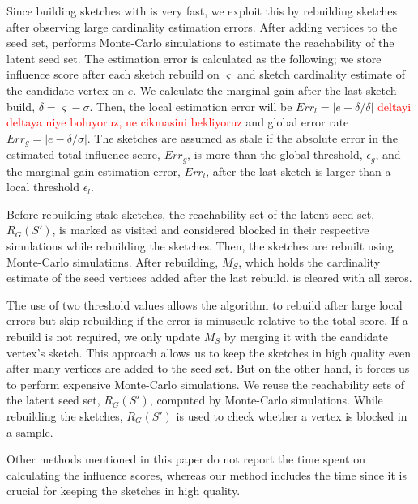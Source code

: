 \documentclass[10pt,journal,compsoc]{IEEEtran}
\newcommand\acro{{\sc{HyperFuseR\xspace}\xspace}\xspace}
\newcommand\kktodo[1]{\textcolor{red}{#1}}
\begin{document}
Since building sketches with \acro is very fast, we exploit this by rebuilding sketches after observing large cardinality estimation errors.
After adding vertices to the seed set, \acro performs Monte-Carlo simulations to estimate the reachability of the latent seed set.
The estimation error is calculated as the following; we store influence score after each sketch rebuild on $\varsigma$ and sketch cardinality estimate of the candidate vertex on $e$. We calculate the marginal gain after the last sketch build, $\delta=\varsigma - \sigma$. Then, the local estimation error will be $Err_l=|e-\delta / \delta|$ \kktodo{deltayi deltaya niye boluyoruz, ne cikmasini bekliyoruz} and global error rate $Err_g=|e-\delta / \sigma|$. 
The sketches are assumed as stale if the absolute error in the estimated total influence score, $Err_g$, is more than the global threshold, $\epsilon_{g}$, 
and the marginal gain estimation error, $Err_l$, after the last sketch is larger than a local threshold $\epsilon_{l}$.

Before rebuilding stale sketches, the reachability set of the latent seed set, $R_G(S')$, is marked as visited and considered blocked in their respective simulations while rebuilding the sketches. Then, the sketches are rebuilt using Monte-Carlo simulations. After rebuilding, $M_S$, which holds the cardinality estimate of the seed vertices added after the last rebuild, is cleared with all zeros.

The use of two threshold values allows the algorithm to rebuild after large local errors but skip rebuilding if the error is minuscule relative to the total score. 
If a rebuild is not required, we only update $M_S$ by merging it with the candidate vertex's sketch. 
This approach allows us to keep the sketches in high quality even after many vertices are added to the seed set. But on the other hand, it forces us to perform expensive Monte-Carlo simulations. 
We reuse the reachability sets of the latent seed set, $R_G(S')$, computed by Monte-Carlo simulations. While rebuilding the sketches, $R_G(S')$ is used to check whether a vertex is blocked in a sample.

Other methods mentioned in this paper do not report the time spent on calculating the influence scores, 
whereas our method includes the time since it is crucial for keeping the sketches in high quality.
\end{document}

